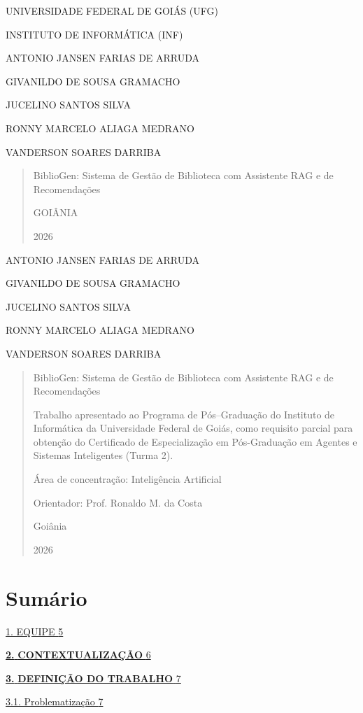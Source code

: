 \documentclass[
]{article}
\author{}
\date{}
\begin{document}
UNIVERSIDADE FEDERAL DE GOIÁS (UFG)

INSTITUTO DE INFORMÁTICA (INF)

ANTONIO JANSEN FARIAS DE ARRUDA

GIVANILDO DE SOUSA GRAMACHO

JUCELINO SANTOS SILVA

RONNY MARCELO ALIAGA MEDRANO

VANDERSON SOARES DARRIBA

\begin{quote}
BiblioGen: Sistema de Gestão de Biblioteca com Assistente RAG e de
Recomendações

GOIÂNIA

2026
\end{quote}

ANTONIO JANSEN FARIAS DE ARRUDA

GIVANILDO DE SOUSA GRAMACHO

JUCELINO SANTOS SILVA

RONNY MARCELO ALIAGA MEDRANO

VANDERSON SOARES DARRIBA

\begin{quote}
BiblioGen: Sistema de Gestão de Biblioteca com Assistente RAG e de
Recomendações

Trabalho apresentado ao Programa de Pós--Graduação do Instituto de
Informática da Universidade Federal de Goiás, como requisito parcial
para obtenção do Certificado de Especialização em Pós-Graduação em
Agentes e Sistemas Inteligentes (Turma 2).

Área de concentração: Inteligência Artificial

Orientador: Prof. Ronaldo M. da Costa

Goiânia

2026
\end{quote}

\section{Sumário}\label{sumuxe1rio}

\hyperref[_Toc230227800]{1. EQUIPE \hyperref[_Toc230227800]{5}}

\hyperref[_Toc230227801]{\textbf{2.} \textbf{CONTEXTUALIZAÇÃO}
\hyperref[_Toc230227801]{6}}

\hyperref[_Toc230227802]{\textbf{3.} \textbf{DEFINIÇÃO DO TRABALHO}
\hyperref[_Toc230227802]{7}}

\hyperref[_Toc230227803]{3.1. Problematização
\hyperref[_Toc230227803]{7}}
\end{document}
